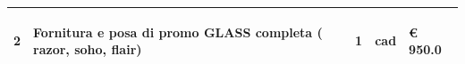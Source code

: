 \documentclass[a4paper]{article}
\begin{document}
\begin{tabular}{ | L{10mm} |  L{86mm} | L{12mm} | L{12mm} | L{16mm} | }
                                 
                                   \vspace{2.5mm}
                                   \begin{spacing}{0}
                                2
                                   \end{spacing} &
                                   \vspace{2.5mm}
                                   \begin{spacing}{0}
                                Fornitura e posa di promo GLASS  completa ( razor, soho, flair)
                                   \end{spacing} &
                                   \vspace{2.5mm}
                                   \begin{spacing}{0}
                                1
                                   \end{spacing} &
                                   \vspace{2.5mm}
                                   \begin{spacing}{0}
                                cad
                                   \end{spacing} &
                                   \vspace{2.5mm}
                                   \begin{spacing}{0}
                                     \euro\hfill 
                                 950.0
                                   \end{spacing} \\
                                   \hline


\end{tabular}
\end{document}
